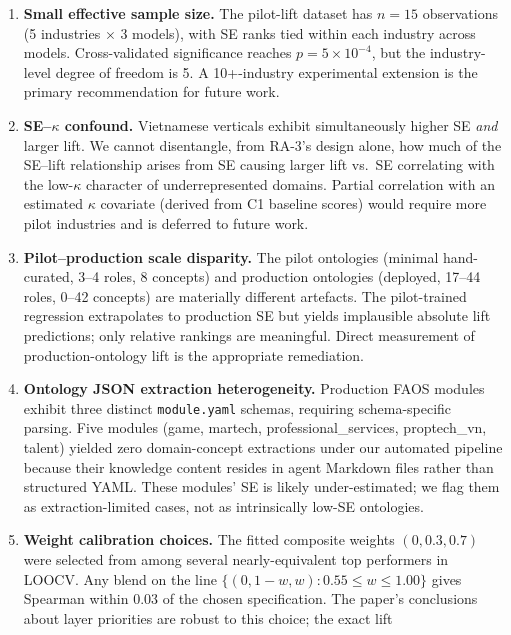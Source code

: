 \documentclass[11pt,a4paper]{article}
\newcommand{\kapp}{\kappa}
\begin{document}
\begin{enumerate}[leftmargin=2em]
  \item \textbf{Small effective sample size.} The pilot-lift dataset has
    $n = 15$ observations (5 industries $\times$ 3 models), with SE
    ranks tied within each industry across models. Cross-validated
    significance reaches $p = 5 \times 10^{-4}$, but the
    industry-level degree of freedom is 5. A 10+-industry experimental
    extension is the primary recommendation for future work.
  \item \textbf{SE--$\kapp$ confound.} Vietnamese verticals exhibit
    simultaneously higher SE \emph{and} larger lift. We cannot
    disentangle, from RA-3's design alone, how much of the SE--lift
    relationship arises from SE causing larger lift vs.\ SE correlating
    with the low-$\kapp$ character of underrepresented domains. Partial
    correlation with an estimated $\kapp$ covariate (derived from C1
    baseline scores) would require more pilot industries and is deferred
    to future work.
  \item \textbf{Pilot--production scale disparity.} The pilot ontologies
    (minimal hand-curated, 3--4 roles, 8 concepts) and production
    ontologies (deployed, 17--44 roles, 0--42 concepts) are materially
    different artefacts. The pilot-trained regression extrapolates to
    production SE but yields implausible absolute lift predictions;
    only relative rankings are meaningful. Direct measurement of
    production-ontology lift is the appropriate remediation.
  \item \textbf{Ontology JSON extraction heterogeneity.} Production
    FAOS modules exhibit three distinct \texttt{module.yaml} schemas,
    requiring schema-specific parsing. Five modules (game, martech,
    professional\_services, proptech\_vn, talent) yielded zero
    domain-concept extractions under our automated pipeline because
    their knowledge content resides in agent Markdown files rather than
    structured YAML. These modules' SE is likely under-estimated;
    we flag them as extraction-limited cases, not as intrinsically
    low-SE ontologies.
  \item \textbf{Weight calibration choices.} The fitted composite weights
    $(0, 0.3, 0.7)$ were selected from among several nearly-equivalent
    top performers in LOOCV. Any blend on the line
    $\{(0, 1-w, w) : 0.55 \leq w \leq 1.00\}$ gives Spearman within
    0.03 of the chosen specification. The paper's conclusions about
    layer priorities are robust to this choice; the exact lift

\end{enumerate}
\end{document}
